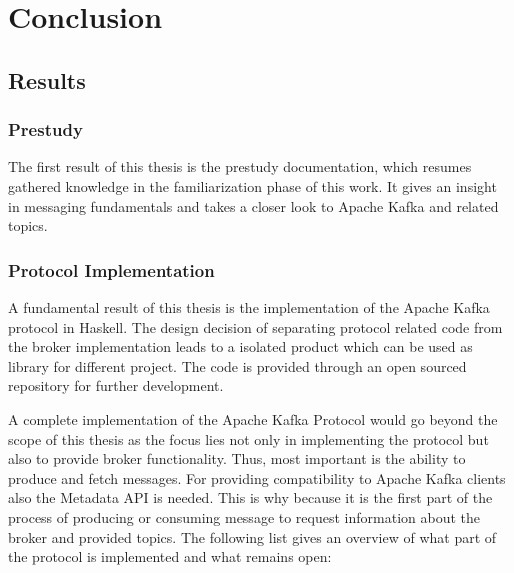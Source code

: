 \chapter{Conclusion}
\section{Results}
\subsection{Prestudy}
The first result of this thesis is the prestudy documentation, which
resumes gathered knowledge in the familiarization phase of this work.
It gives an insight in messaging fundamentals and  takes a closer look to Apache
Kafka and related topics.

\subsection{Protocol Implementation}
A fundamental result of this thesis is the implementation of the Apache Kafka
protocol in Haskell. The design decision of separating protocol related code
from the broker implementation leads to a isolated product which can be used as
library for different project. The code is provided through an open sourced
repository for further development. 

A complete implementation of the Apache Kafka Protocol would go beyond the scope
of this thesis as the focus lies not only in implementing the protocol but also
to provide broker functionality. Thus, most important is the ability to produce
and fetch messages. For providing compatibility to Apache Kafka clients also
the Metadata API is needed. This is why because it is the first part of the
process of producing or consuming message to request information about the
broker and provided topics. The following list gives an overview of what part
of the protocol is implemented and what remains open:


